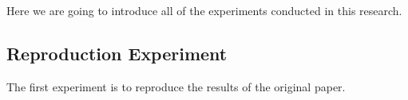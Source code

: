 Here we are going to introduce all of the experiments conducted in this research.

\subsection{Reproduction Experiment}

The first experiment is to reproduce the results of the original paper.